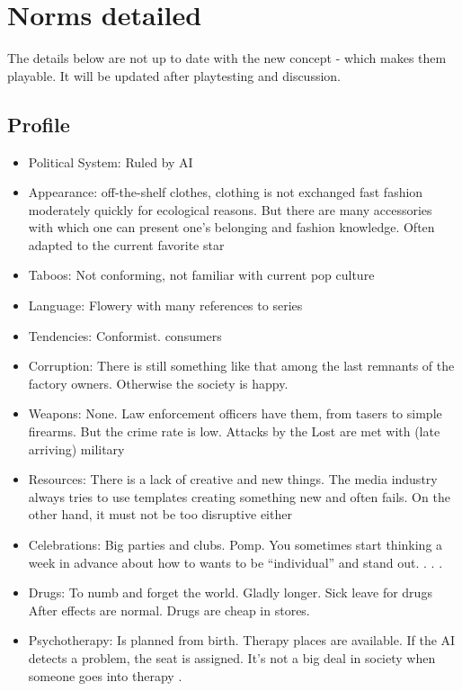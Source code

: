 \chapter {Norms detailed}


\begin{warning}
    The details below are not up to date with the new concept - which makes them playable. It will be updated after playtesting and discussion.
\end{warning}


\section{Profile}

\begin{itemize}
    \item Political System: Ruled by AI
    \item Appearance: off-the-shelf clothes, clothing is not exchanged fast fashion moderately quickly for ecological reasons. But there are many accessories with which one can present one's belonging and fashion knowledge. Often adapted to the current favorite star
    \item Taboos: Not conforming, not familiar with current pop culture
    \item Language: Flowery with many references to series
    \item Tendencies: Conformist. consumers
    \item Corruption: There is still something like that among the last remnants of the factory owners. Otherwise the society is happy.
    \item Weapons: None. Law enforcement officers have them, from tasers to simple firearms. But the crime rate is low. Attacks by the Lost are met with (late arriving) military
    \item Resources: There is a lack of creative and new things. The media industry always tries to use templates creating something new and often fails. On the other hand, it must not be too disruptive either
    \item Celebrations: Big parties and clubs. Pomp. You sometimes start thinking a week in advance about how to wants to be “individual” and stand out. . . .
    \item Drugs: To numb and forget the world. Gladly longer. Sick leave for drugs After effects are normal. Drugs are cheap in stores.
    \item Psychotherapy: Is planned from birth. Therapy places are available. If the AI detects a problem, the seat is assigned. It's not a big deal in society when someone goes into therapy .

\end{itemize}
